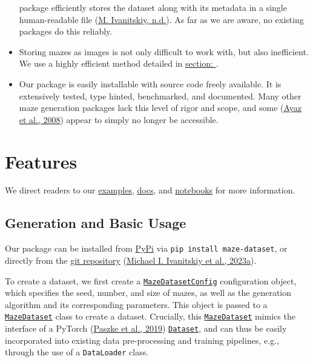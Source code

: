 \documentclass[10pt,a4paper,onecolumn]{article}
\begin{document}
\begin{itemize}
  package efficiently stores the dataset along with its metadata in a
  single human-readable file (\protect\hyperlink{ref-zanj}{M.
  Ivanitskiy, n.d.}). As far as we are aware, no existing packages do
  this reliably.
\item
  Storing mazes as images is not only difficult to work with, but also
  inefficient. We use a highly efficient method detailed in
  \hyperref[sec:implementation]{section: \textit{}}.
\item
  Our package is easily installable with source code freely available.
  It is extensively tested, type hinted, benchmarked, and documented.
  Many other maze generation packages lack this level of rigor and
  scope, and some (\protect\hyperlink{ref-ayaz2008maze}{Ayaz et al.,
  2008}) appear to simply no longer be accessible.
\end{itemize}

\hypertarget{features}{%
\section{Features}\label{features}}

We direct readers to our
\href{https://understanding-search.github.io/maze-dataset/examples/maze_examples.html}{examples},
\href{https://understanding-search.github.io/maze-dataset/maze_dataset.html}{docs},
and
\href{https://understanding-search.github.io/maze-dataset/notebooks/}{notebooks}
for more information.

\hypertarget{generation}{%
\subsection{Generation and Basic Usage}\label{generation}}

Our package can be installed from
\href{https://pypi.org/project/maze-dataset/}{PyPi} via
\texttt{pip\ install\ maze-dataset}, or directly from the
\href{https://github.com/understanding-search/maze-dataset}{git
repository} (\protect\hyperlink{ref-maze-dataset-github}{Michael I.
Ivanitskiy et al., 2023a}).

To create a dataset, we first create a
\href{https://understanding-search.github.io/maze-dataset/maze_dataset.html\#MazeDatasetConfig}{\texttt{MazeDatasetConfig}}
configuration object, which specifies the seed, number, and size of
mazes, as well as the generation algorithm and its corresponding
parameters. This object is passed to a
\href{https://understanding-search.github.io/maze-dataset/maze_dataset.html\#MazeDataset}{\texttt{MazeDataset}}
class to create a dataset. Crucially, this
\href{https://understanding-search.github.io/maze-dataset/maze_dataset.html\#MazeDataset}{\texttt{MazeDataset}}
mimics the interface of a PyTorch
(\protect\hyperlink{ref-pytorch}{Paszke et al., 2019})
\href{https://pytorch.org/docs/stable/data.html}{\texttt{Dataset}}, and
can thus be easily incorporated into existing data pre-processing and
training pipelines, e.g., through the use of a \texttt{DataLoader}
class.
\end{document}
